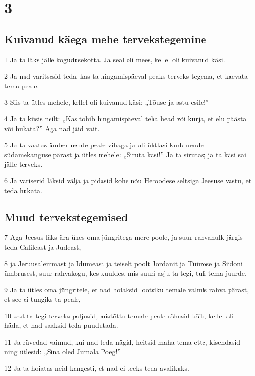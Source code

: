 \chapter{3}

\section*{Kuivanud käega mehe tervekstegemine}

\par 1 Ja ta läks jälle kogudusekotta. Ja seal oli mees, kellel oli kuivanud käsi.
\par 2 Ja nad varitsesid teda, kas ta hingamispäeval peaks terveks tegema, et kaevata tema peale.
\par 3 Siis ta ütles mehele, kellel oli kuivanud käsi: „Tõuse ja astu esile!”
\par 4 Ja ta küsis neilt: „Kas tohib hingamispäeval teha head või kurja, et elu päästa või hukata?” Aga nad jäid vait.
\par 5 Ja ta vaatas ümber nende peale vihaga ja oli ühtlasi kurb nende südamekanguse pärast ja ütles mehele: „Siruta käsi!” Ja ta sirutas; ja ta käsi sai jälle terveks.
\par 6 Ja variserid läksid välja ja pidasid kohe nõu Heroodese seltsiga Jeesuse vastu, et teda hukata.

\section*{Muud tervekstegemised}

\par 7 Aga Jeesus läks ära ühes oma jüngritega mere poole, ja suur rahvahulk järgis teda Galileast ja Judeast,
\par 8 ja Jeruusalemmast ja Idumeast ja teiselt poolt Jordanit ja Tüürose ja Siidoni ümbrusest, suur rahvakogu, kes kuuldes, mis suuri asju ta tegi, tuli tema juurde.
\par 9 Ja ta ütles oma jüngritele, et nad hoiaksid lootsiku temale valmis rahva pärast, et see ei tungiks ta peale,
\par 10 sest ta tegi terveks paljusid, mistõttu temale peale rõhusid kõik, kellel oli häda, et nad saaksid teda puudutada.
\par 11 Ja rüvedad vaimud, kui nad teda nägid, heitsid maha tema ette, kisendasid ning ütlesid: „Sina oled Jumala Poeg!”
\par 12 Ja ta hoiatas neid kangesti, et nad ei teeks teda avalikuks.

